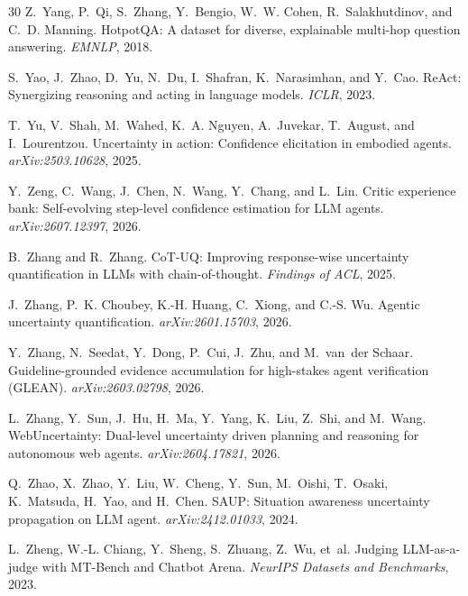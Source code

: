 \documentclass{article}
\begin{document}
\begin{thebibliography}{30}
Z.~Yang, P.~Qi, S.~Zhang, Y.~Bengio, W.~W. Cohen, R.~Salakhutdinov, and
C.~D. Manning.
\newblock HotpotQA: A dataset for diverse, explainable multi-hop question
answering.
\newblock \emph{EMNLP}, 2018.

S.~Yao, J.~Zhao, D.~Yu, N.~Du, I.~Shafran, K.~Narasimhan, and Y.~Cao.
\newblock ReAct: Synergizing reasoning and acting in language models.
\newblock \emph{ICLR}, 2023.

T.~Yu, V.~Shah, M.~Wahed, K.~A. Nguyen, A.~Juvekar, T.~August, and
I.~Lourentzou.
\newblock Uncertainty in action: Confidence elicitation in embodied agents.
\newblock \emph{arXiv:2503.10628}, 2025.

Y.~Zeng, C.~Wang, J.~Chen, N.~Wang, Y.~Chang, and L.~Lin.
\newblock Critic experience bank: Self-evolving step-level confidence
estimation for LLM agents.
\newblock \emph{arXiv:2607.12397}, 2026.

B.~Zhang and R.~Zhang.
\newblock CoT-UQ: Improving response-wise uncertainty quantification in LLMs
with chain-of-thought.
\newblock \emph{Findings of ACL}, 2025.

J.~Zhang, P.~K. Choubey, K.-H. Huang, C.~Xiong, and C.-S. Wu.
\newblock Agentic uncertainty quantification.
\newblock \emph{arXiv:2601.15703}, 2026.

Y.~Zhang, N.~Seedat, Y.~Dong, P.~Cui, J.~Zhu, and M.~van~der Schaar.
\newblock Guideline-grounded evidence accumulation for high-stakes agent
verification (GLEAN).
\newblock \emph{arXiv:2603.02798}, 2026.

L.~Zhang, Y.~Sun, J.~Hu, H.~Ma, Y.~Yang, K.~Liu, Z.~Shi, and M.~Wang.
\newblock WebUncertainty: Dual-level uncertainty driven planning and reasoning
for autonomous web agents.
\newblock \emph{arXiv:2604.17821}, 2026.

Q.~Zhao, X.~Zhao, Y.~Liu, W.~Cheng, Y.~Sun, M.~Oishi, T.~Osaki,
K.~Matsuda, H.~Yao, and H.~Chen.
\newblock SAUP: Situation awareness uncertainty propagation on LLM agent.
\newblock \emph{arXiv:2412.01033}, 2024.

L.~Zheng, W.-L. Chiang, Y.~Sheng, S.~Zhuang, Z.~Wu, et~al.
\newblock Judging LLM-as-a-judge with MT-Bench and Chatbot Arena.
\newblock \emph{NeurIPS Datasets and Benchmarks}, 2023.

\end{thebibliography}
\end{document}
